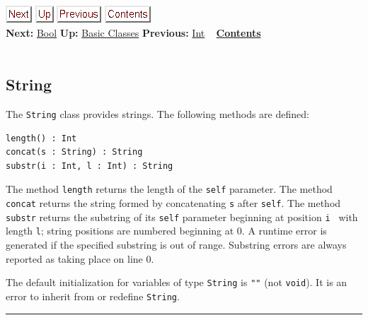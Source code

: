 \documentclass[]{article}
\begin{document}
\href{node31.html}{\includegraphics{next.png}}
\href{node26.html}{\includegraphics{up.png}}
\href{node29.html}{\includegraphics{prev.png}}
\href{node1.html}{\includegraphics{contents.png}} \\ \textbf{Next:}
\href{node31.html}{Bool} \textbf{Up:} \href{node26.html}{Basic Classes}
\textbf{Previous:} \href{node29.html}{Int} ~
\textbf{\href{node1.html}{Contents}} \\ \\

\subsection{String}

The \texttt{String} class provides strings. The following methods are
defined:

\begin{verbatim}
length() : Int
concat(s : String) : String
substr(i : Int, l : Int) : String
\end{verbatim}

The method \texttt{length} returns the length of the \texttt{self}
parameter. The method \texttt{concat} returns the string formed by
concatenating \texttt{s} after \texttt{self}. The method \texttt{substr}
returns the substring of its \texttt{self} parameter beginning at
position \texttt{i } with length \texttt{l}; string positions are
numbered beginning at 0. A runtime error is generated if the specified
substring is out of range. Substring errors are always reported as
taking place on line 0.

The default initialization for variables of type \texttt{String} is
\texttt{""} (not \texttt{void}). It is an error to inherit from or
redefine \texttt{String}.

\begin{center}\rule{3in}{0.4pt}\end{center}
\end{document}
